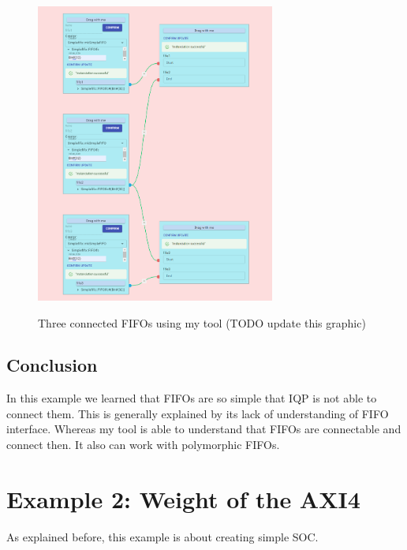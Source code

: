 \documentclass[12pt]{report}
\begin{document}
\begin{figure}[H]
    \caption{Three connected FIFOs using my tool (TODO update this graphic)}
    \includegraphics[width=0.7\textwidth]{images/Example1MySolution.png} \\
    \centering
\end{figure}
\subsection{Conclusion}
In this example we learned that FIFOs are so simple that IQP is not able to connect them. This is generally explained by its lack of understanding of FIFO interface. Whereas my tool is able to understand that FIFOs are connectable and connect then. It also can work with polymorphic FIFOs. 
\section{Example 2: Weight of the AXI4}
As explained before, this example is about creating simple SOC.
\end{document}
